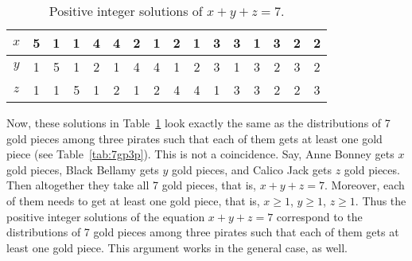 \begin{table}[!htb]
\caption{Positive integer solutions of $x+y+z = 7$.}\label{tab:x+y+z=7}
\begin{center}
\begin{tabular}{|c||c|c|c|c|c|c|c|c|c|c|c|c|c|c|c|}
\hline
$x$ & 5 & 1 & 1 & 4 & 4 & 2 & 1 & 2 & 1 & 3 & 3 & 1 & 3 & 2 & 2\\
\hline
$y$ & 1 & 5 & 1 & 2 & 1 & 4 & 4 & 1 & 2 & 3 & 1 & 3 & 2 & 3 & 2\\
\hline
$z$ & 1 & 1 & 5 & 1 & 2 & 1 & 2 & 4 & 4 & 1 & 3 & 3 & 2 & 2 & 3\\
\hline
\end{tabular}
\end{center}
\end{table}
\vfill\eject

Now, these solutions in Table~\ref{tab:x+y+z=7} look exactly the same as 
the distributions of 7 gold pieces among three pirates such that each of them gets at least one gold piece (see Table~\ref{tab:7gp3p}). 
This is not a coincidence. 
Say, Anne Bonney gets $x$ gold pieces, Black Bellamy gets $y$ gold pieces, and Calico Jack gets $z$ gold pieces. 
Then altogether they take all 7 gold pieces, that is, $x+y+z = 7$. 
Moreover, each of them needs to get at least one gold piece, 
that is, $x \geq 1$, $y \geq 1$, $z \geq 1$. 
Thus the positive integer solutions of the equation $x+y+z =7$ correspond 
to the distributions of 7 gold pieces among three pirates such that each of them gets at least one gold piece. 
This argument works in the general case, as well. 

